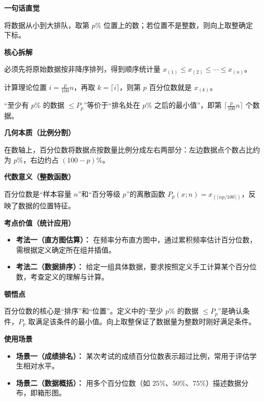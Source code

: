 \begin{explanationbox}

	\textbf{\textcolor{CExplanation}{一句话直觉}}

	将数据从小到大排队，取第 $p\text{\%}$ 位置上的数；若位置不是整数，则向上取整确定下标。

	\medskip
	\textbf{\textcolor{CExplanation}{核心拆解}}
	\begin{description}[style=nextline, leftmargin=2.8em, labelsep=0.5em, itemsep=0.45em]
		\item[\textbf{要点一（排序前提）：}] 必须先将原始数据按非降序排列，得到顺序统计量 $x_{(1)}\le x_{(2)}\le\cdots\le x_{(n)}$。
		\item[\textbf{要点二（位置计算）：}] 计算理论位置 $i=\frac{p}{100}n$，再取 $k=\lceil i\rceil$，则第 $p$ 百分位数就是 $x_{(k)}$。
		\item[\textbf{要点三（等价理解）：}] “至少有 $p\text{\%}$ 的数据 $\le P_p$”等价于“排名处在 $p\text{\%}$ 之后的最小值”，即第 $\lceil\frac{p}{100}n\rceil$ 个数据。
	\end{description}

	\medskip
	\textbf{\textcolor{CExplanation}{几何本质（比例分割）}}

	在数轴上，百分位数将数据点按数量比例分成左右两部分：左边数据点个数占比约为 $p\text{\%}$，右边约占 $(100-p)\text{\%}$。

	\medskip
	\textbf{\textcolor{CExplanation}{代数意义（整数函数）}}

	百分位数是“样本容量 $n$”和“百分等级 $p$”的离散函数 $P_p(x;n)=x_{(\lceil np/100\rceil)}$，反映了数据的位置特征。

	\medskip
	\textbf{\textcolor{CExplanation}{考点价值（统计应用）}}
	\begin{itemize}[leftmargin=*, itemsep=0.5em, topsep=0.4em]
		\item \textbf{考法一（直方图估算）：} 在频率分布直方图中，通过累积频率估计百分位数，需根据定义确定所在组并插值。
		\item \textbf{考法二（数据排序）：} 给定一组具体数据，要求按照定义手工计算某个百分位数，考查定义的理解与计算。
	\end{itemize}

	\medskip
	\textbf{\textcolor{CExplanation}{顿悟点}}

	百分位数的核心是“排序”和“位置”。定义中的“至少 $p\text{\%}$ 的数据 $\le P_p$”是确认条件，$P_p$ 取满足该条件的最小值。向上取整保证了数据量为整数时刚好满足条件。

	\medskip
	\textbf{\textcolor{CExplanation}{使用场景}}
	\begin{itemize}[leftmargin=*, itemsep=0.5em, topsep=0.4em]
		\item \textbf{场景一（成绩排名）：} 某次考试的成绩百分位数表示超过比例，常用于评估学生相对水平。
		\item \textbf{场景二（数据概括）：} 用多个百分位数（如 $25\text{\%}$、$50\text{\%}$、$75\text{\%}$）描述数据分布，即箱形图。
	\end{itemize}
\end{explanationbox}
